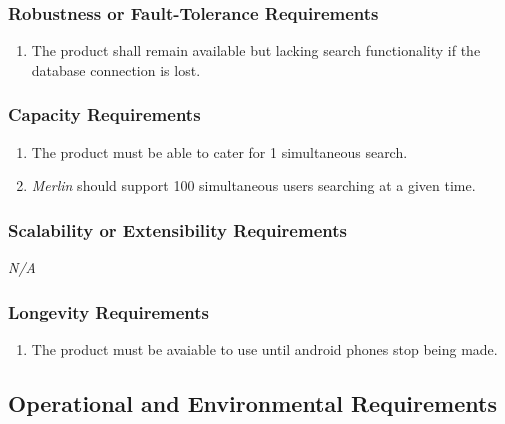 \documentclass[]{article}
\newcommand{\merlin}{\textit{Merlin }}
\newcounter{saveenum}
\newcommand{\pauseEnum}{\setcounter{saveenum}{\value{enumi}}}
\newcommand{\resumeEnum}{\setcounter{enumi}{\value{saveenum}}}
\newcommand{\NA}{\indent\indent\emph{N/A}}
\begin{document}
\subsubsection{Robustness or Fault-Tolerance Requirements}
\label{ssub:robustness_or_fault_tolerance_requirements}
\begin{enumerate}[{PR}1. ]
	\resumeEnum
	\item The product shall remain available but lacking search functionality if the database connection is lost.
	\pauseEnum
\end{enumerate}

\subsubsection{Capacity Requirements}
\label{ssub:capacity_requirements}
\begin{enumerate}[{PR}1. ]
	\resumeEnum
	\item The product must be able to cater for 1 simultaneous search.
	\item \merlin should support 100 simultaneous users searching at a given time.
	\pauseEnum
\end{enumerate}

\subsubsection{Scalability or Extensibility Requirements}
\label{ssub:scalability_or_extensibility_requirements}
	\NA

\subsubsection{Longevity Requirements}
\label{ssub:longevity_requirements}
	\begin{enumerate}[{PR}1. ]
	\resumeEnum
	\item The product must be avaiable to use until android phones stop being made.
	\pauseEnum
\end{enumerate}


\subsection{Operational and Environmental Requirements}
\label{sub:operational_and_environmental_requirements}
\end{document}
